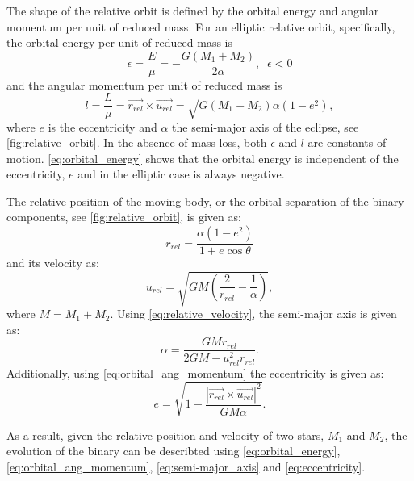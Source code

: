 The shape of the relative orbit is defined by the orbital energy and angular momentum per unit of reduced mass. For an elliptic relative orbit, specifically, the orbital energy per unit of reduced mass is
\begin{equation}\label{eq:orbital_energy}
    \epsilon = \frac{E}{\mu} = - \frac{G (M_1 + M_2)}{2\alpha}, \; \; \epsilon  < 0
\end{equation}
and the angular momentum per unit of reduced mass is
\begin{equation}\label{eq:orbital_ang_momentum}
    l = \frac{L}{\mu} = \vec{r_{rel}} \times \vec{u_{rel}} =\sqrt{G (M_1 + M_2) \alpha (1-e^2)},
\end{equation}
where $e$ is the eccentricity and $\alpha$ the semi-major axis of the eclipse, see \cref{fig:relative_orbit}. In the absence of mass loss, both $\epsilon$ and $l$ are constants of motion.  \cref{eq:orbital_energy} shows that the orbital energy is independent of the eccentricity, $e$ and in the elliptic case is always negative.

The relative position of the moving body, or the orbital separation of the binary components, see \cref{fig:relative_orbit}, is given as:
\begin{equation}\label{eq:relative_position}
    r_{rel} = \frac{\alpha (1-e^2)}{1+e \cos{\theta}}
\end{equation}
and its velocity as:
\begin{equation}\label{eq:relative_velocity}
    u_{rel}= \sqrt{GM \left( \frac{2}{r_{rel}} - \frac{1}{\alpha}\right)},
\end{equation}
where $M = M_1 + M_2$. Using \cref{eq:relative_velocity}, the semi-major axis is given as:
\begin{equation}\label{eq:semi-major_axis}
    \alpha = \frac{GM r_{rel}}{2GM - u_{rel}^2 r_{rel}}.
\end{equation}
Additionally, using  \cref{eq:orbital_ang_momentum} the eccentricity is given as:
\begin{equation}\label{eq:eccentricity}
    e = \sqrt{1 - \frac{|\vec{r_{rel}} \times \vec{u_{rel}}|^2}{G M \alpha}}.
\end{equation}

As a result, given the relative position and velocity of two stars, $M_1$ and $M_2$, the evolution of the binary can be describted using \cref{eq:orbital_energy}, \cref{eq:orbital_ang_momentum}, \cref{eq:semi-major_axis} and \cref{eq:eccentricity}.

